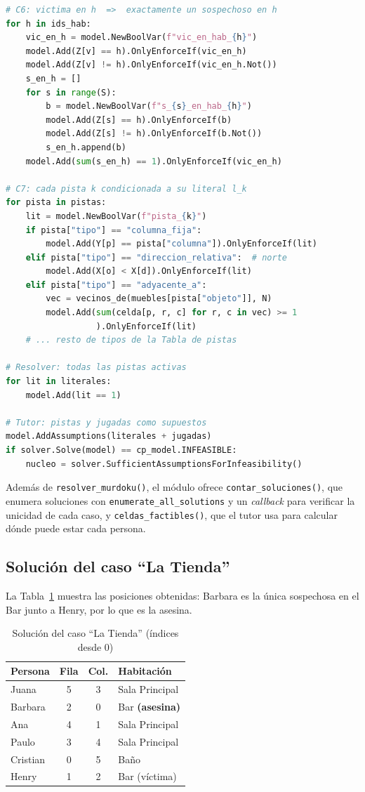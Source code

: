 \documentclass[conference,a4paper]{IEEEtran}
\begin{document}
\begin{lstlisting}[language=Python,caption={Restricciones reificadas C6--C7 y diagnóstico},label={lst:reif}]
# C6: victima en h  =>  exactamente un sospechoso en h
for h in ids_hab:
    vic_en_h = model.NewBoolVar(f"vic_en_hab_{h}")
    model.Add(Z[v] == h).OnlyEnforceIf(vic_en_h)
    model.Add(Z[v] != h).OnlyEnforceIf(vic_en_h.Not())
    s_en_h = []
    for s in range(S):
        b = model.NewBoolVar(f"s_{s}_en_hab_{h}")
        model.Add(Z[s] == h).OnlyEnforceIf(b)
        model.Add(Z[s] != h).OnlyEnforceIf(b.Not())
        s_en_h.append(b)
    model.Add(sum(s_en_h) == 1).OnlyEnforceIf(vic_en_h)

# C7: cada pista k condicionada a su literal l_k
for pista in pistas:
    lit = model.NewBoolVar(f"pista_{k}")
    if pista["tipo"] == "columna_fija":
        model.Add(Y[p] == pista["columna"]).OnlyEnforceIf(lit)
    elif pista["tipo"] == "direccion_relativa":  # norte
        model.Add(X[o] < X[d]).OnlyEnforceIf(lit)
    elif pista["tipo"] == "adyacente_a":
        vec = vecinos_de(muebles[pista["objeto"]], N)
        model.Add(sum(celda[p, r, c] for r, c in vec) >= 1
                  ).OnlyEnforceIf(lit)
    # ... resto de tipos de la Tabla de pistas

# Resolver: todas las pistas activas
for lit in literales:
    model.Add(lit == 1)

# Tutor: pistas y jugadas como supuestos
model.AddAssumptions(literales + jugadas)
if solver.Solve(model) == cp_model.INFEASIBLE:
    nucleo = solver.SufficientAssumptionsForInfeasibility()
\end{lstlisting}

Además de \texttt{resolver\_murdoku()}, el módulo ofrece \texttt{contar\_soluciones()}, que
enumera soluciones con \texttt{enumerate\_all\_solutions} y un \emph{callback} para
verificar la unicidad de cada caso, y \texttt{celdas\_factibles()}, que el tutor usa para
calcular dónde puede estar cada persona.

\subsection{Solución del caso ``La Tienda''}
La Tabla~\ref{tab:solucion} muestra las posiciones obtenidas: Barbara es la única
sospechosa en el Bar junto a Henry, por lo que es la asesina.

\begin{table}[t]
\centering
\caption{Solución del caso ``La Tienda'' (índices desde 0)}
\label{tab:solucion}
\begin{tabular}{lccl}
\toprule
\textbf{Persona} & \textbf{Fila} & \textbf{Col.} & \textbf{Habitación}\\
\midrule
Juana    & 5 & 3 & Sala Principal\\
Barbara  & 2 & 0 & Bar \textbf{(asesina)}\\
Ana      & 4 & 1 & Sala Principal\\
Paulo    & 3 & 4 & Sala Principal\\
Cristian & 0 & 5 & Baño\\
Henry    & 1 & 2 & Bar (víctima)\\
\bottomrule
\end{tabular}
\end{table}
\end{document}
